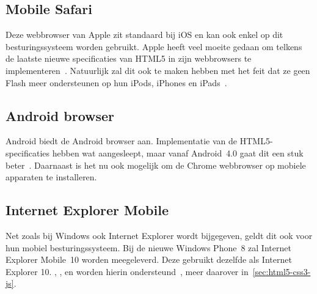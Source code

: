 \begin{table}[t]
\centering
{}
\caption{Marktaandeel mobiele webbrowsers op januari 2013~\cite{NetApplications2012}.}
\label{tabel:marktaandeel-browsers}
\end{table}

\subsection{Mobile Safari}
\label{sec:mobile-safari}
Deze webbrowser van Apple zit standaard bij iOS en kan ook enkel op dit besturingssysteem worden gebruikt. 
Apple heeft veel moeite gedaan om telkens de laatste nieuwe specificaties van HTML5 in zijn webbrowsers te implementeren~\cite{Hales2012}. 
Natuurlijk zal dit ook te maken hebben met het feit dat ze geen Flash meer ondersteunen op hun iPods, iPhones en iPads~\cite{Jobs2010}.

\subsection{Android browser}
\label{sec:android-browser}
Android biedt de  Android browser aan. 
Implementatie van de HTML5-specificaties hebben wat aangesleept, maar vanaf Android~4.0 gaat dit een stuk beter~\cite{Hales2012}. 
Daarnaast is het nu ook mogelijk om de Chrome webbrowser op mobiele apparaten te installeren.

\subsection{Internet Explorer Mobile}
Net zoals bij Windows ook Internet Explorer wordt bijgegeven, geldt dit ook voor hun mobiel  besturingssysteem. 
Bij de nieuwe Windows Phone~8 zal Internet Explorer Mobile~10 worden meegeleverd. 
Deze gebruikt dezelfde  als Internet Explorer 10. 
, ,  en  worden hierin ondersteund~\cite{Hales2012}, meer daarover in~\ref{sec:html5-css3-js}.

